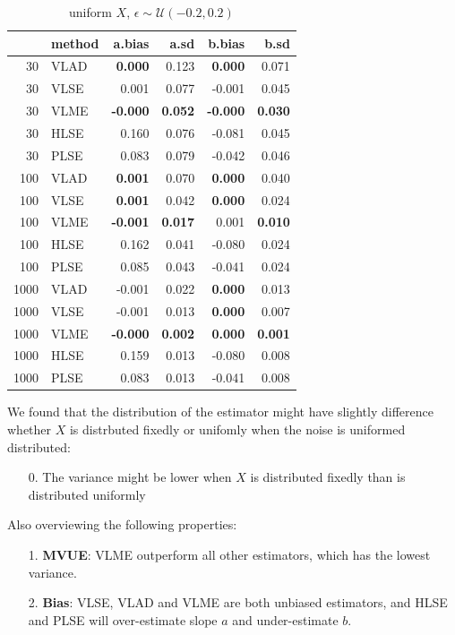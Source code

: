\documentclass[twoside]{article}
\begin{document}
\begin{table}[ht]
\centering
\caption{uniform $X$, $\epsilon \sim \mathcal{U}(-0.2,0.2)$}
\begin{tabular}{rlrrrr}
  \hline
 & method & a.bias & a.sd & b.bias & b.sd \\ 
  \hline
  30 & VLAD & \textbf{0.000} & 0.123 & \textbf{0.000} & 0.071 \\ 
  30 & VLSE & 0.001 & 0.077 & -0.001 & 0.045 \\ 
  30 & VLME & \textbf{-0.000} & \textbf{0.052} & \textbf{-0.000} & \textbf{0.030} \\ 
  30 & HLSE & 0.160 & 0.076 & -0.081 & 0.045 \\ 
  30 & PLSE & 0.083 & 0.079 & -0.042 & 0.046 \\
  \hline
  100 & VLAD & \textbf{0.001} & 0.070 & \textbf{0.000} & 0.040 \\ 
  100 & VLSE & \textbf{0.001} & 0.042 & \textbf{0.000} & 0.024 \\ 
  100 & VLME & \textbf{-0.001} & \textbf{0.017} & 0.001 & \textbf{0.010} \\ 
  100 & HLSE & 0.162 & 0.041 & -0.080 & 0.024 \\ 
  100 & PLSE & 0.085 & 0.043 & -0.041 & 0.024 \\  
  \hline
  1000 & VLAD & -0.001 & 0.022 & \textbf{0.000} & 0.013 \\ 
  1000 & VLSE & -0.001 & 0.013 & \textbf{0.000} & 0.007 \\ 
  1000 & VLME & \textbf{-0.000} & \textbf{0.002} & \textbf{0.000} & \textbf{0.001} \\ 
  1000 & HLSE & 0.159 & 0.013 & -0.080 & 0.008 \\ 
  1000 & PLSE & 0.083 & 0.013 & -0.041 & 0.008 \\ 
   \hline
\end{tabular}
\label{uu}
\end{table}

We found that the distribution of the estimator might have slightly difference whether $X$ is distrbuted fixedly or unifomly when the noise is uniformed distributed:

\begin{itemize}
  \item [0.] The variance might be lower when $X$ is distributed fixedly than is distributed uniformly
\end{itemize}

Also overviewing the following properties:

\begin{itemize}
  \item [1.] \textbf{MVUE}: VLME outperform all other estimators, which has the lowest variance.
  \item [2.] \textbf{Bias}: VLSE, VLAD and VLME are both unbiased estimators, and HLSE and PLSE will over-estimate slope $a$ and under-estimate $b$.
\end{itemize}
\end{document}
